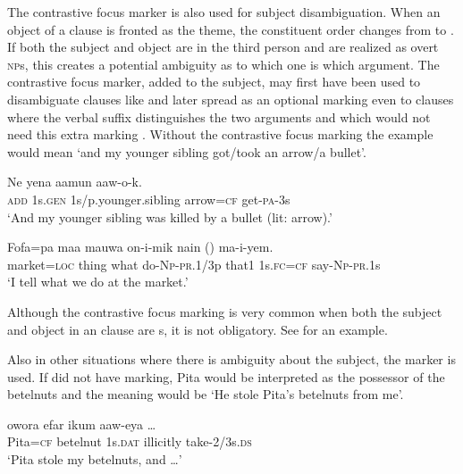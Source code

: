 The contrastive focus marker is also used for subject disambiguation. When an object of a clause is fronted as the theme, the constituent order changes from  to . If both the subject and object are in the third person and are realized as overt \textsc{np}s, this creates a potential ambiguity as to which one is which argument. The contrastive focus marker, added to the subject, may first have been used to disambiguate clauses like  and later spread as an optional marking even to clauses where the verbal suffix distinguishes the two arguments and which would not need this extra marking . Without the contrastive focus marking the example  would mean `and my younger sibling got/took an arrow/a bullet'.

\ea%
\label{ex:x1695}
\gll Ne  yena  aamun    aaw-o-k. \\
\textsc{add}  1s.\textsc{gen}  1s/p.younger.sibling  arrow=\textsc{cf}  get-\textsc{pa}-3s      \\
\glt`And my younger sibling was killed by a bullet (lit: arrow).'
\z


\ea%
\label{ex:x1696}
\gll Fofa=pa  maa  mauwa  on-i-mik  nain  () ma-i-yem. \\
market=\textsc{loc}  thing  what  do-\textsc{Np}-\textsc{pr}.1/3p  that1  1s.\textsc{fc}=\textsc{cf} say-\textsc{Np}-\textsc{pr}.1s     \\
\glt`I tell what we do at the market.' 
\z


Although the contrastive focus marking is very common when both the subject and object in an  clause are s, it is not obligatory. See  for an example.

Also in other situations where there is ambiguity about the subject, the  marker is used. If  did not have  marking, Pita would be interpreted as the possessor of the betelnuts and the meaning would be `He stole Pita's betelnuts from me'.

\ea%
\label{ex:x1705}
\gll {}  owora  efar  ikum  aaw-eya {\dots}\\
Pita=\textsc{cf}  betelnut  1s.\textsc{dat}  illicitly  take-2/3s.\textsc{ds}\\
\glt`Pita stole my betelnuts, and {\dots}'
\z


